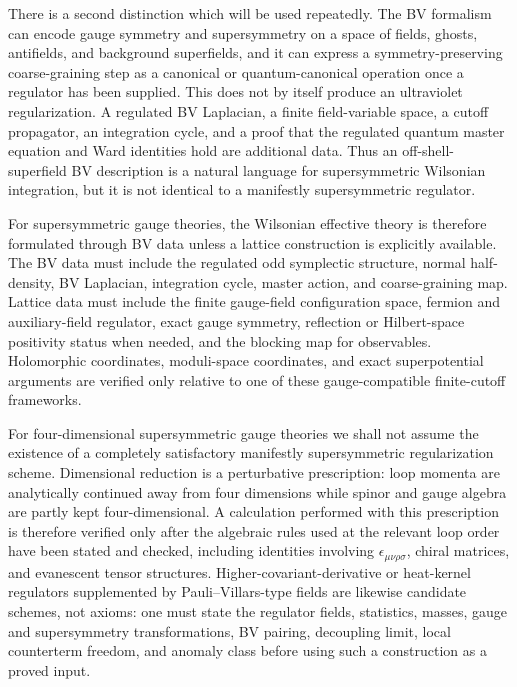 There is a second distinction which will be used repeatedly.  The BV
formalism can encode gauge symmetry and supersymmetry on a space of fields,
ghosts, antifields, and background superfields, and it can express a
symmetry-preserving coarse-graining step as a canonical or quantum-canonical
operation once a regulator has been supplied.  This does not by itself produce
an ultraviolet regularization.  A regulated BV Laplacian, a finite
field-variable space, a cutoff propagator, an integration cycle, and a proof
that the regulated quantum master equation and Ward identities hold are
additional data.  Thus an off-shell-superfield BV description is a natural
language for supersymmetric Wilsonian integration, but it is not identical to
a manifestly supersymmetric regulator.

For supersymmetric gauge theories, the Wilsonian effective theory is therefore
formulated through BV data unless a lattice construction is explicitly
available.  The BV data must include the regulated odd symplectic structure,
normal half-density, BV Laplacian, integration cycle, master action, and
coarse-graining map.  Lattice data must include the finite gauge-field
configuration space, fermion and auxiliary-field regulator, exact gauge
symmetry, reflection or Hilbert-space positivity status when needed, and the
blocking map for observables.  Holomorphic coordinates, moduli-space
coordinates, and exact superpotential arguments are verified only relative to
one of these gauge-compatible finite-cutoff frameworks.

For four-dimensional supersymmetric gauge theories we shall not assume the
existence of a completely satisfactory manifestly supersymmetric
regularization scheme.  Dimensional reduction is a perturbative prescription:
loop momenta are analytically continued away from four dimensions while
spinor and gauge algebra are partly kept four-dimensional.  A calculation
performed with this prescription is therefore verified only after the
algebraic rules used at the relevant loop order have been stated and checked,
including identities involving \(\epsilon_{\mu\nu\rho\sigma}\), chiral
matrices, and evanescent tensor structures.  Higher-covariant-derivative or
heat-kernel regulators supplemented by Pauli--Villars-type fields are likewise
candidate schemes, not axioms: one must state the regulator fields, statistics,
masses, gauge and supersymmetry transformations, BV pairing, decoupling limit,
local counterterm freedom, and anomaly class before using such a construction
as a proved input.

